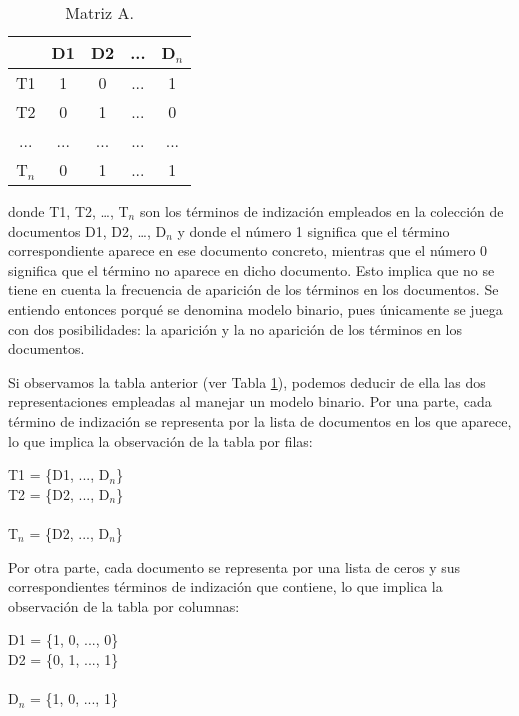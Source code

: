 \documentclass{article}
\begin{document}
\begin{table}[h]
	\begin{center}
		\begin{tabular}{ |c|c|c|c|c| }
			\hline 
			& D1 & D2 & ... & D$_{n}$ \\ 
			\hline
			T1 & 1 & 0 & ... & 1 \\ 
			\hline
			T2 & 0 & 1 & ... & 0 \\ 
			\hline
			... & ... & ...	& ... & ... \\
			\hline
			T$_{n}$ & 0 & 1 & ... & 1 \\ 
			\hline
		\end{tabular}
		\caption{Matriz A.}
		\label{table: Table 2}
	\end{center}
\end{table}

donde T1, T2, …, T$_{n}$ son los términos de indización empleados en la colección de documentos D1, D2, …, D$_{n}$ y donde el número 1 significa que el término correspondiente aparece en ese documento concreto, mientras que el número 0 significa que el término no aparece en dicho documento. Esto implica que no se tiene en cuenta la frecuencia de aparición de los términos en los documentos. Se entiendo entonces porqué se denomina modelo binario, pues únicamente se juega con dos posibilidades: la aparición y la no aparición de los términos en los documentos.

Si observamos la tabla anterior (ver Tabla \ref{table: Table 2}), podemos deducir de ella las dos representaciones empleadas al manejar un modelo binario. Por una parte, cada término de indización se representa por la lista de documentos en los que aparece, lo que implica la observación de la tabla por filas:

\begin{center}
	T1 = \{D1, ..., D$_{n}$\} \\
	T2 = \{D2, ..., D$_{n}$\} \\
	 \\
	T$_{n}$ = \{D2, ..., D$_{n}$\} \\
\end{center}

Por otra parte, cada documento se representa por una lista de ceros y sus correspondientes términos de indización que contiene, lo que implica la observación de la tabla por columnas:

\begin{center}
	D1 = \{1, 0, ..., 0\} \\
	D2 = \{0, 1, ..., 1\} \\
	 \\
	D$_{n}$ = \{1, 0, ..., 1\} \\
\end{center}
\end{document}
